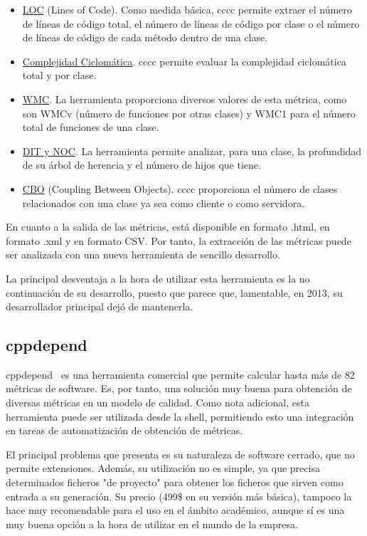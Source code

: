 \documentclass[11pt]{article}
\begin{document}
\begin{itemize}
\item{\underline{LOC} (Lines of Code)}. Como medida básica, cccc permite extraer el número de líneas de código total, el número de líneas de código por clase o el número de líneas de código de cada método dentro de una clase.
\item{\underline{Complejidad Ciclomática}}. cccc permite evaluar la complejidad ciclomática total y por clase.
\item{\underline{WMC}}. La herramienta proporciona diversos valores de esta métrica, como son WMCv (número de funciones por otras clases) y WMC1 para el número total de funciones de una clase.
\item{\underline{DIT y NOC}}. La herramienta permite analizar, para una clase, la profundidad de su árbol de herencia y el número de hijos que tiene.
\item{\underline{CBO} (Coupling Between Objects)}. cccc proporciona el número de clases relacionados con una clase ya sea como cliente o como servidora.

\end{itemize}

En cuanto a la salida de las métricas, está disponible en formato .html, en formato .xml y en formato CSV. Por tanto, la extracción de las métricas puede ser analizada con una nueva herramienta de sencillo desarrollo.

La principal desventaja a la hora de utilizar esta herramienta es la no continuación de su desarrollo, puesto que parece que, lamentable, en 2013, su desarrollador principal dejó de mantenerla.

\subsection{cppdepend}

cppdepend~\cite{metrictools:cppdepend} es una herramienta comercial que permite calcular hasta más de 82 métricas de software. Es, por tanto, una solución muy buena para obtención de diversas métricas en un modelo de calidad. Como nota adicional, esta herramienta puede ser utilizada desde la shell, permitiendo esto una integración en tareas de automatización de obtención de métricas.

El principal problema que presenta es su naturaleza de software cerrado, que no permite extensiones. Además, su utilización no es simple, ya que precisa determinados ficheros "de proyecto" para obtener los ficheros que sirven como entrada a su generación. Su precio (499\$ en su versión más básica), tampoco la hace muy recomendable para el uso en el ámbito académico, aunque sí es una muy buena opción a la hora de utilizar en el mundo de la empresa.
\end{document}

